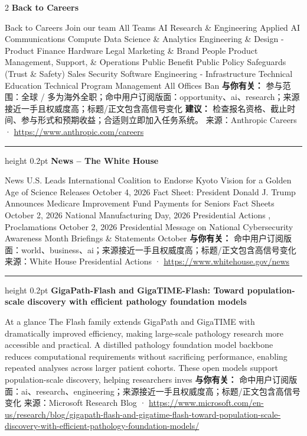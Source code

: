 \documentclass[10.5pt]{ctexart}
\begin{document}
\begin{multicols}{2}
{\large\bfseries Back to Careers}\par
Back to Careers Join our team All Teams AI Research \& Engineering Applied AI Communications Compute Data Science \& Analytics Engineering \& Design - Product Finance Hardware Legal Marketing \& Brand People Product Management, Support, \& Operations Public Benefit Public Policy Safeguards (Trust \& Safety) Sales Security Software Engineering - Infrastructure Technical Education Technical Program Management All Offices Ban
\textbf{与你有关：} 参与范围：全球 / 多为海外全职；命中用户订阅版面：opportunity、ai、research；来源接近一手且权威度高；标题/正文包含高信号变化
\textbf{建议：} 检查报名资格、截止时间、参与形式和预期收益；合适则立即加入任务系统。
{\footnotesize\color{ormuted} 来源：Anthropic Careers · \url{https://www.anthropic.com/careers}}
\vspace{2mm}
\hrule height 0.2pt
\vspace{2mm}
{\large\bfseries News – The White House}\par
News U.S. Leads International Coalition to Endorse Kyoto Vision for a Golden Age of Science Releases October 4, 2026 Fact Sheet: President Donald J. Trump Announces Medicare Improvement Fund Payments for Seniors Fact Sheets October 2, 2026 National Manufacturing Day, 2026 Presidential Actions , Proclamations October 2, 2026 Presidential Message on National Cybersecurity Awareness Month Briefings \& Statements October 
\textbf{与你有关：} 命中用户订阅版面：world、business、ai；来源接近一手且权威度高；标题/正文包含高信号变化
{\footnotesize\color{ormuted} 来源：White House Presidential Actions · \url{https://www.whitehouse.gov/news}}
\vspace{2mm}
\hrule height 0.2pt
\vspace{2mm}
{\large\bfseries GigaPath-Flash and GigaTIME-Flash: Toward population-scale discovery with efficient pathology foundation models}\par
At a glance The Flash family extends GigaPath and GigaTIME with dramatically improved efficiency, making large-scale pathology research more accessible and practical. A distilled pathology foundation model backbone reduces computational requirements without sacrificing performance, enabling repeated analyses across larger patient cohorts. These open models support population-scale discovery, helping researchers inves
\textbf{与你有关：} 命中用户订阅版面：ai、research、engineering；来源接近一手且权威度高；标题/正文包含高信号变化
{\footnotesize\color{ormuted} 来源：Microsoft Research Blog · \url{https://www.microsoft.com/en-us/research/blog/gigapath-flash-and-gigatime-flash-toward-population-scale-discovery-with-efficient-pathology-foundation-models/}}

\end{multicols}
\end{document}
